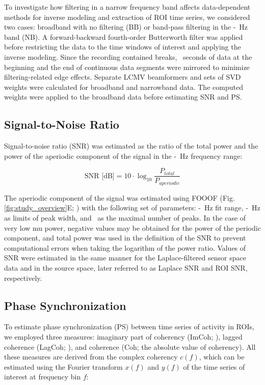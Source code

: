 \medskip

To investigate how filtering in a narrow frequency band affects data-dependent methods for inverse modeling and extraction of ROI time series, we considered two cases: broadband with no filtering (BB) or band-pass filtering in the \muLow-\muHigh~Hz band (NB). A forward-backward fourth-order Butterworth filter was applied before restricting the data to the time windows of interest and applying the inverse modeling. Since the recording contained breaks, \mirrorSeconds~seconds of data at the beginning and the end of continuous data segments were mirrored to minimize filtering-related edge effects. Separate LCMV beamformers and sets of SVD weights were calculated for broadband and narrowband data. The computed weights were applied to the broadband data before estimating SNR and PS.

\subsection{Signal-to-Noise Ratio}

Signal-to-noise ratio (SNR) was estimated as the ratio of the total power and the power of the aperiodic component of the signal in the \muLow-\muHigh~Hz frequency range:

\begin{equation}
    \text{SNR [dB]} = 10 \cdot \log_{10} \frac{P_{total}}{P_{aperiodic}}
\end{equation}

The aperiodic component of the signal was estimated using FOOOF (Fig. \ref{fig:study_overview}E; \cite{FOOOF_Donoghue2020}) with the following set of parameters: \fooofFitRangeLow-\fooofFitRangeHigh~Hz fit range, \fooofPeakWidthMin-\fooofPeakWidthMax~Hz as limits of peak width, and \fooofNumPeaksMax~as the maximal number of peaks. In the case of very low mu power, negative values may be obtained for the power of the periodic component, and total power was used in the definition of the SNR to prevent computational errors when taking the logarithm of the power ratio. Values of SNR were estimated in the same manner for the Laplace-filtered sensor space data and in the source space, later referred to as Laplace SNR and ROI SNR, respectively.

\subsection{Phase Synchronization}

To estimate phase synchronization (PS) between time series of activity in ROIs, we employed three measures: imaginary part of coherency (ImCoh; \cite{Nolte2004}), lagged coherence (LagCoh; \cite{PascualMarqui2011}), and coherence (Coh; the absolute value of coherency). All these measures are derived from the complex coherency $c(f)$, which can be estimated using the Fourier transform $x(f)$ and $y(f)$ of the time series of interest at frequency bin $f$:

